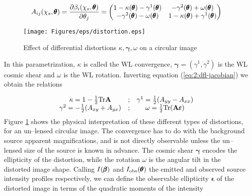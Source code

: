 \begin{equation}
\label{eq:2:dfl-jacobian}
A_{ij}(\chi_s,\pmb{\theta}) = \frac{\partial \beta_i(\chi_s,\pmb{\theta})}{\partial \theta_j} = 
\begin{pmatrix}
1-\kappa(\pmb{\theta})-\gamma^1(\pmb{\theta}) & -\gamma^2(\pmb{\theta})+\omega(\pmb{\theta}) \\
-\gamma^2(\pmb{\theta})-\omega(\pmb{\theta}) & 1-\kappa(\pmb{\theta})+\gamma^1(\pmb{\theta})
\end{pmatrix}
\end{equation}  
%
\begin{figure}
\begin{center}
\texttt{[image: Figures/eps/distortion.eps]}
\end{center}
\caption{Effect of differential distortions $\kappa,\pmb{\gamma},\omega$ on a circular image}
\label{fig:2:distortion}
\end{figure}
%
In this parametrization, $\kappa$ is called the WL convergence, $\pmb{\gamma}=(\gamma^1,\gamma^2)$ is the WL cosmic shear and $\omega$ is the WL rotation. Inverting equation (\ref{eq:2:dfl-jacobian}) we obtain the relations

\begin{equation}
\label{eq:2:dfl-inverse}
\begin{matrix}
\kappa = 1-\frac{1}{2}{\rm Tr} \mathbf{A} & ; & \gamma^1 = \frac{1}{2}(A_{yy} - A_{xx}) \\
\gamma^2 = -\frac{1}{2}(A_{xy}+A_{yx}) & ; & \omega = \frac{1}{2}{\rm Tr} (\mathbf{A}\pmb{\varepsilon})
\end{matrix}
\end{equation}
% 
Figure \ref{fig:2:distortion} shows the physical interpretation of these different types of distortions, for an un--lensed circular image. The convergence has to do with the background source apparent magnifications, and is not directly observable unless the un--lensed size of the source is known in advance. The cosmic shear $\pmb{\gamma}$ encodes the ellipticity of the distortion, while the rotation $\omega$ is the angular tilt in the distorted image shape. Calling $I(\pmb{\beta})$ and $I_{\rm obs}(\pmb{\theta})$ the emitted and observed source intensity profiles respectively, we can define the observable ellipticity $\pmb{\epsilon}$ of the distorted image in terms of the quadratic moments of the intensity 

